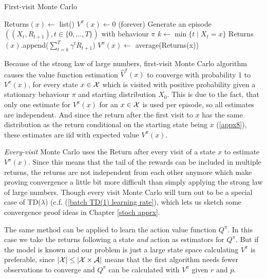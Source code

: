 \begin{algorithm}
	\caption{First-visit Monte Carlo}
	\begin{algorithmic}[1]
		 
			\State Returns\((x)\gets\) list()
			\State \(V^\pi(x)\gets 0\)
		\EndFor
		 (forever) 
			\State Generate an episode \(((X_t,R_{t+1}), t\in\{0,\dots,T\})\) with behaviour \(\pi\)
				\State \(k\gets \min\{t \mid X_t=x\}\)
				\State Returns\((x)\).append(\(\sum_{t=k}^T\gamma^tR_{t+1}\))
				\State \(V^\pi(x)\gets\) average(Returns(x))
			\EndFor
		\EndWhile
	\end{algorithmic}
\end{algorithm}

Because of the strong law of large numbers, first-visit Monte Carlo algorithm causes the value function estimation \(\hat{V}^\pi(x)\) to converge with probability 1 to \(V^\pi(x)\), for every state \(x\in\mathcal{X}\) which is visited with positive probability given a stationary behaviour \(\pi\) and starting distribution \(X_0\). This is due to the fact, that only one estimate for \(V^\pi(x)\) for an \(x\in\mathcal{X}\) is used per episode, so all estimates are independent. And since the return after the first visit to \(x\) has the same distribution as the return conditional on the starting state being \(x\) (\ref{appx8}), these estimates are iid with expected value \(V^\pi(x)\).

\emph{Every-visit} Monte Carlo uses the Return after every visit of a state \(x\) to estimate \(V^\pi(x)\). Since this means that the tail of the rewards can be included in multiple returns, the returns are not independent from each other anymore which make proving convergence a little bit more difficult than simply applying the strong law of large numbers. Though every visit Monte Carlo will turn out to be a special case of TD(\(\lambda\)) (c.f. (\ref{batch TD(1) learning rate}), which lets us sketch some convergence proof ideas in Chapter \ref{stoch apprx}.

The same method can be applied to learn the action value function \(Q^\pi\). In this case we take the returns following a state \emph{and} action as estimators for \(Q^\pi\). But if the model is known and our problem is just a large state space calculating \(V^\pi\) is preferable, since \(|\mathcal{X}|\le |\mathcal{X}\times\mathcal{A}|\) means that the first algorithm needs fewer observations to converge and \(Q^\pi\) can be calculated with \(V^\pi\) given \(r\) and \(p\).

